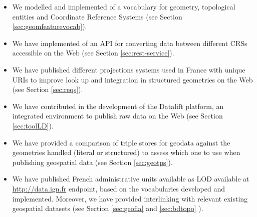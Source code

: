 \documentclass[a4paper,11pt,twoside]{report}
\begin{document}
\begin{itemize}
\item We modelled and implemented of a vocabulary for geometry, topological entities and Coordinate Reference Systems (see Section \ref{sec:geomfeaturevocab}).
\item We have implemented of an API for converting data between different CRSs accessible on the Web (see Section \ref{sec:rest-service}).
\item We have published different projections systems used in France with unique URIs to improve look up and integration in structured geometries on the Web (see Section \ref{sec:reqs}).
\item We have contributed in the development of the Datalift platform, an integrated environment to publish raw data on the Web (see Section \ref{sec:toolLD}).
\item We have provided a comparison of triple stores for geodata against the geometries handled (literal or structured) to assess which one to use when publishing geospatial data (see Section \ref{sec:geotps}). 
\item We have published French administrative units available as LOD available at \url{http://data.ign.fr} endpoint, based on the vocabularies developed and implemented. Moreover, we have provided interlinking with relevant existing geospatial datasets (see Section \ref{sec:geofla} and \ref{sec:bdtopo} ).


\end{itemize}
\end{document}
